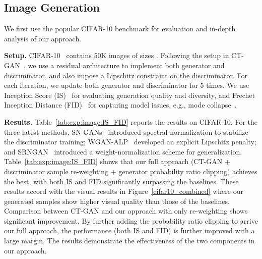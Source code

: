 \documentclass{article}
\newcommand{\0}{\bm{0}}
\begin{document}
\subsection{Image Generation}\label{sec:exp:image}
We first use the popular CIFAR-10 benchmark for evaluation and in-depth analysis of our approach.






\textbf{Setup.}  
CIFAR-10~\cite{cifar10} contains 50K images of sizes . Following the setup in CT-GAN~\cite{wwgan}, 
we use a residual architecture to implement both generator and discriminator, and also impose a Lipschitz constraint on the discriminator. For each iteration, we update both generator and discriminator for 5 times. We use Inception Score (IS)~\cite{salimans2016improved} for evaluating generation quality and diversity, and Frechet Inception Distance (FID)~\cite{FID} for capturing model issues, e.g., mode collapse~\cite{xu2018empirical}. 












\textbf{Results.} Table~\ref{tab:exp:image:IS_FID} reports the results on CIFAR-10. 
For the three latest methods, SN-GANs~\cite{SNGAN} introduced spectral normalization to stabilize the discriminator training; WGAN-ALP~\cite{wganalp} developed an explicit Lipschitz penalty; and SRNGAN~\cite{srngan} introduced a weight-normalization scheme for generalization.
Table~\ref{tab:exp:image:IS_FID} shows that our full approach (CT-GAN + discriminator sample re-weighting + generator probability ratio clipping) achieves the best, with both IS and FID significantly surpassing the  baselines. These results accord with the visual results in Figure~\ref{cifar10_combined} where our generated samples show higher visual quality than those of the baselines. Comparison between CT-GAN and our approach with only re-weighting shows significant improvement. By further adding the probability ratio clipping to arrive our full approach, the performance (both IS and FID) is further improved with a large margin. The results demonstrate the effectiveness of the two components in our approach. 






 
\end{document}
